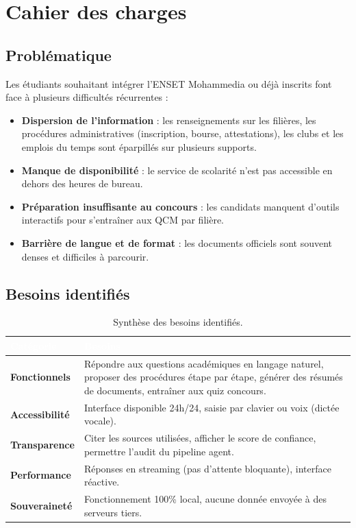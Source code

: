 \documentclass[11pt, a4paper]{article}
\begin{document}
\section{Cahier des charges}

\subsection{Problématique}

Les étudiants souhaitant intégrer l'ENSET Mohammedia ou déjà inscrits font face à plusieurs difficultés récurrentes :

\begin{itemize}
    \item \textbf{Dispersion de l'information} : les renseignements sur les filières, les procédures administratives (inscription, bourse, attestations), les clubs et les emplois du temps sont éparpillés sur plusieurs supports.
    \item \textbf{Manque de disponibilité} : le service de scolarité n'est pas accessible en dehors des heures de bureau.
    \item \textbf{Préparation insuffisante au concours} : les candidats manquent d'outils interactifs pour s'entraîner aux QCM par filière.
    \item \textbf{Barrière de langue et de format} : les documents officiels sont souvent denses et difficiles à parcourir.
\end{itemize}

\subsection{Besoins identifiés}

\begin{table}[H]
    \centering
    \sffamily
    \renewcommand{\arraystretch}{1.4}
    \begin{tabularx}{\textwidth}{>{\bfseries}p{3.5cm} X}
        \toprule
        \rowcolor{mypurple}
        \textcolor{white}{Catégorie} & \textcolor{white}{Besoins} \\
        \midrule
        Fonctionnels & Répondre aux questions académiques en langage naturel, proposer des procédures étape par étape, générer des résumés de documents, entraîner aux quiz concours. \\
        \rowcolor{codegray}
        Accessibilité & Interface disponible 24h/24, saisie par clavier ou voix (dictée vocale). \\
        Transparence & Citer les sources utilisées, afficher le score de confiance, permettre l'audit du pipeline agent. \\
        \rowcolor{codegray}
        Performance & Réponses en streaming (pas d'attente bloquante), interface réactive. \\
        Souveraineté & Fonctionnement 100\% local, aucune donnée envoyée à des serveurs tiers. \\
        \bottomrule
    \end{tabularx}
    \caption{Synthèse des besoins identifiés.}
\end{table}
\end{document}
